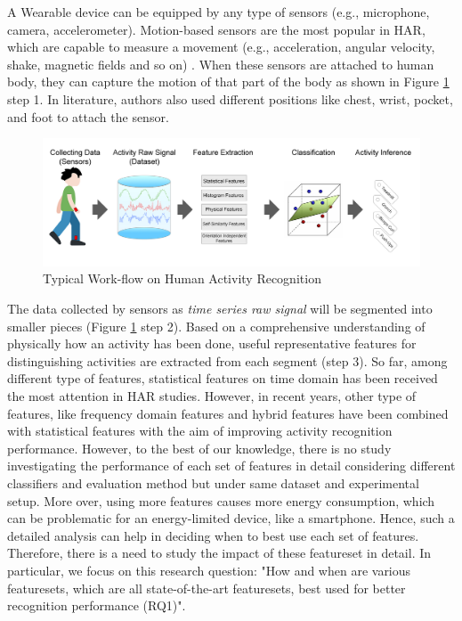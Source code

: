 \documentclass[journal,article,submit,moreauthors,pdftex]{Definitions/mdpi}
\begin{document}
A Wearable device can be equipped by any type of sensors (e.g., microphone, camera, accelerometer). Motion-based sensors are the most popular in HAR, which are capable to measure a movement (e.g., acceleration, angular velocity, shake, magnetic fields and so on) \cite{hassan2018robust}. When these sensors are attached to human body, they can capture the motion of that part of the body as shown in Figure \ref{fig:main_approach} step 1. In literature\cite{morris2014recofit, s140610146,wang2019survey }, authors also used different positions like chest, wrist, pocket, and foot to attach the sensor.

\begin{figure}[H]
	\centering
	\includegraphics[width=14 cm]{Definitions/images/main_approach.jpg}
	\caption{Typical Work-flow on Human Activity Recognition}
	\label{fig:main_approach}
\end{figure} 
The data collected by sensors as \textit{time series raw signal} will be segmented into smaller pieces (Figure \ref{fig:main_approach} step 2). Based on a comprehensive understanding of physically how an activity has been done, useful representative features for distinguishing activities are extracted from each segment (step 3)\cite{rosati2018comparison, wang2019survey}.
So far, among different type of features, statistical features on time domain has been received the most attention in HAR studies. However, in recent years, other type of features, like frequency domain features and hybrid features have been combined with statistical features with the aim of improving activity recognition performance\cite{wang2019survey, morris2014recofit}. However, to the best of our knowledge, there is no study investigating the performance of each set of features in detail considering different classifiers and evaluation method but under same dataset and experimental setup. More over, using more features causes more energy consumption, which can be problematic for an energy-limited device, like a smartphone\cite{Nourani_CoMoRea2019}. Hence, such a detailed analysis can help in deciding when to best use each set of features. Therefore, there is a need to study the impact of these featureset in detail. In particular, we focus on this research question: "How and when are various featuresets, which are all state-of-the-art featuresets, best used for better recognition performance (RQ1)".
\end{document}
